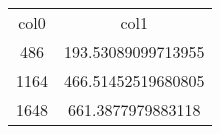 \begin{table}
\begin{tabular}{cc}
col0 & col1 \\
486 & 193.53089099713955 \\
1164 & 466.51452519680805 \\
1648 & 661.3877979883118 \\
\end{tabular}
\end{table}
